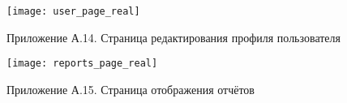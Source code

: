 \begin{figure}[!htbp]
	\texttt{[image: user\_page\_real]}
	\centering
	\caption*{Приложение А.14. Страница редактирования профиля пользователя}
\end{figure}

\begin{figure}[!htbp]
	\texttt{[image: reports\_page\_real]}
	\centering
	\caption*{Приложение А.15. Страница отображения отчётов}
\end{figure}

\cleardoublepage




